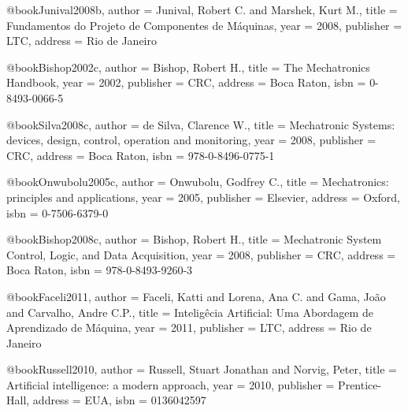 @book{Junival2008b,
  author = {Junival, Robert C. and Marshek, Kurt M.},
  title = {Fundamentos do Projeto de Componentes de Máquinas},
  year = {2008},
  publisher = {LTC},
  address = {Rio de Janeiro}
}

@book{Bishop2002c,
  author = {Bishop, Robert H.},
  title = {The Mechatronics Handbook},
  year = {2002},
  publisher = {CRC},
  address = {Boca Raton},
  isbn = {0-8493-0066-5}
}

@book{Silva2008c,
  author = {de Silva, Clarence W.},
  title = {Mechatronic Systems: devices, design, control, operation and monitoring},
  year = {2008},
  publisher = {CRC},
  address = {Boca Raton},
  isbn = {978-0-8496-0775-1}
}

@book{Onwubolu2005c,
  author = {Onwubolu, Godfrey C.},
  title = {Mechatronics: principles and applications},
  year = {2005},
  publisher = {Elsevier},
  address = {Oxford},
  isbn = {0-7506-6379-0}
}

@book{Bishop2008c,
  author = {Bishop, Robert H.},
  title = {Mechatronic System Control, Logic, and Data Acquisition},
  year = {2008},
  publisher = {CRC},
  address = {Boca Raton},
  isbn = {978-0-8493-9260-3}
}

%

@book{Faceli2011,
  author = {Faceli, Katti and Lorena, Ana C. and Gama, João and Carvalho, Andre C.P.},
  title = {Inteligêcia Artificial: Uma Abordagem de Aprendizado de Máquina},
  year = {2011},
  publisher = {LTC},
  address = {Rio de Janeiro}
}

@book{Russell2010,
  author = {Russell, Stuart Jonathan and Norvig, Peter},
  title = {Artificial intelligence: a modern approach},
  year = {2010},
  publisher = {Prentice-Hall},
  address = {EUA},
  isbn = {0136042597}
}

